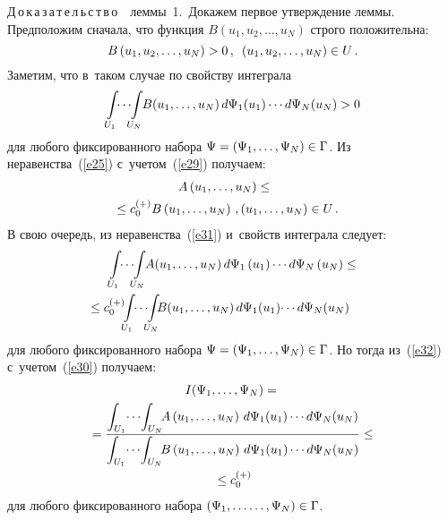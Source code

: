 \begin{multicols}{2}
\noindent
Д\,о\,к\,а\,з\,а\,т\,е\,л\,ь\,с\,т\,в\,о\ \ леммы~1.\ 
Докажем первое утверждение леммы. Предположим сначала, 
что функция $B(u_1, u_2,\ldots,  u_N)$ строго положительна:
\begin{equation}
B\left(u_1, u_2,\ldots, u_N\right)>0\,,\enskip
\left(u_1, u_2,\ldots, u_N\right)\in U\,. \label{e29}
\end{equation}
Заметим, что в~таком случае по свойству интеграла~\cite[гл.~V]{18}
\begin{multline}
\hspace*{-2mm}\int\limits_{U_1}\!\!\cdots\! \!\int\limits_{U_N}\!\!B(u_1, \ldots,u_N) \,
d\Psi_1(u_1)%
\cdots d\Psi_N(u_N)>0 \!\!\!\!\label{e30}
\end{multline}
для любого фиксированного набора $\Psi\hm=(\Psi_1, \ldots, \Psi_N)\hm\in \Gamma$.
Из неравенства~(\ref{e25}) с~уче\-том~(\ref{e29}) получаем:
\begin{multline}
\hspace*{-4mm}A\left(u_1,\ldots, u_N\right)\leq{}\\
\hspace*{-4mm}{}\leq c_0^{(+)} B\left(u_1, \ldots, u_N\right)\,, 
\left(u_1, \ldots, u_N\right)\in U\,. \label{e31}
\end{multline}
В свою очередь, из неравенства~(\ref{e31}) и~свойств интеграла следует:
\begin{multline}
\int\limits_{U_1}\!\!\cdots\! \!\int\limits_{U_N}\!\!A(u_1,\ldots, u_N) \,
d\Psi_1\left(u_1\right)%
\cdots d\Psi_N\left(u_N\right)\leq\\
\hspace*{-24pt}\leq 
c_0^{(+)}\!\!\int\limits_{U_1}\!\!\cdots\!\! \int\limits_{U_N}\!\!\!B\!\left(u_1,\ldots, u_N\right)
 d\Psi_1\!\left(u_1\right)\!%
 \cdots d\Psi_N\!\left(u_N\right)\!\! 
 \label{e32}
\end{multline}
для любого фиксированного набора $\Psi\hm=(\Psi_1, \ldots, \Psi_N)\hm\in \Gamma$. 
Но тогда из~(\ref{e32}) с~учетом~(\ref{e30}) получаем:
\begin{multline}
I(\Psi_1, \ldots, \Psi_N)={}\\
{}=
\fr{\int\nolimits_{U_1}\!\cdots\! \int\nolimits_{U_N}\!\!A\left(u_1, \ldots, u_N\right)\,
 d\Psi_1(u_1)\cdots d\Psi_N(u_N)}{
\int\nolimits_{U_1}\!\cdots\! \int\nolimits_{U_N}\!\!B\left(u_1, \ldots, u_N\right)\,
 d\Psi_1(u_1)
 \cdots d\Psi_N(u_N)}\leq{}\\
 {}\leq c_0^{(+)} 
 \label{e33}
\end{multline}
для любого фиксированного набора $(\Psi_1, \ldots\linebreak\ldots, \Psi_N)\hm\in \Gamma$.


\end{multicols}
